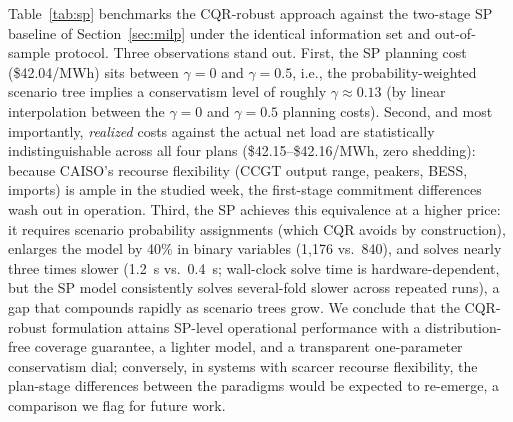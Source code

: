 \documentclass[preprint,12pt,authoryear]{elsarticle}
\begin{document}
Table~\ref{tab:sp} benchmarks the CQR-robust approach against the two-stage SP baseline of Section~\ref{sec:milp} under the identical information set and out-of-sample protocol. Three observations stand out. First, the SP planning cost (\$42.04/MWh) sits between $\gamma = 0$ and $\gamma = 0.5$, i.e., the probability-weighted scenario tree implies a conservatism level of roughly $\gamma \approx 0.13$ (by linear interpolation between the $\gamma = 0$ and $\gamma = 0.5$ planning costs). Second, and most importantly, \emph{realized} costs against the actual net load are statistically indistinguishable across all four plans (\$42.15--\$42.16/MWh, zero shedding): because CAISO's recourse flexibility (CCGT output range, peakers, BESS, imports) is ample in the studied week, the first-stage commitment differences wash out in operation. Third, the SP achieves this equivalence at a higher price: it requires scenario probability assignments (which CQR avoids by construction), enlarges the model by 40\% in binary variables (1{,}176 vs.\ 840), and solves nearly three times slower (1.2~s vs.\ 0.4~s; wall-clock solve time is hardware-dependent, but the SP model consistently solves several-fold slower across repeated runs), a gap that compounds rapidly as scenario trees grow. We conclude that the CQR-robust formulation attains SP-level operational performance with a distribution-free coverage guarantee, a lighter model, and a transparent one-parameter conservatism dial; conversely, in systems with scarcer recourse flexibility, the plan-stage differences between the paradigms would be expected to re-emerge, a comparison we flag for future work.

\begin{table}[htbp]
\centering
\caption{CQR-robust vs.\ two-stage stochastic programming under the same information set (November week). Realized costs from frozen first-stage decisions re-dispatched against actual net load.}
\label{tab:sp}
\small
{}
\end{table}
\end{document}
